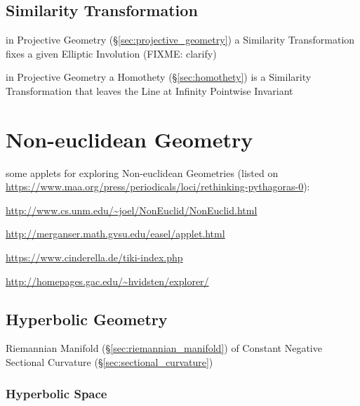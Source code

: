 \subsection{Similarity Transformation}\label{sec:similarity_transformation}

in Projective Geometry (\S\ref{sec:projective_geometry}) a Similarity
Transformation fixes a given Elliptic Involution (FIXME: clarify)

in Projective Geometry a Homothety (\S\ref{sec:homothety}) is a Similarity
Transformation that leaves the Line at Infinity Pointwise Invariant



\section{Non-euclidean Geometry}\label{sec:noneuclidean_geometry}

some applets for exploring Non-euclidean Geometries (listed on
\url{https://www.maa.org/press/periodicals/loci/rethinking-pythagoras-0}):

\url{http://www.cs.unm.edu/~joel/NonEuclid/NonEuclid.html}

\url{http://merganser.math.gvsu.edu/easel/applet.html}

\url{https://www.cinderella.de/tiki-index.php}

\url{http://homepages.gac.edu/~hvidsten/explorer/}



\subsection{Hyperbolic Geometry}\label{sec:hyperbolic_geometry}

Riemannian Manifold (\S\ref{sec:riemannian_manifold}) of Constant Negative
Sectional Curvature (\S\ref{sec:sectional_curvature})



\subsubsection{Hyperbolic Space}\label{sec:hyperbolic_space}

